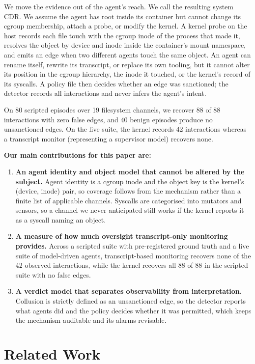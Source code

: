 \documentclass[11pt]{article}
\begin{document}
We move the evidence out of the agent's reach. We call the resulting system CDR.
We assume the agent has root inside its container but cannot change its cgroup
membership, attach a probe, or modify the kernel. A kernel probe on the host
records each file touch with the cgroup inode of the process that made it, resolves
the object by device and inode inside the container's mount namespace, and emits an
edge when two different agents touch the same object. An agent can rename itself,
rewrite its transcript, or replace its own tooling, but it cannot alter its
position in the cgroup hierarchy, the inode it touched, or the kernel's record of
its syscalls. A policy file then decides whether an edge was sanctioned; the
detector records all interactions and never infers the agent's intent.

On 80 scripted episodes over 19 filesystem channels, we recover 88 of 88
interactions with zero false edges, and 40 benign episodes produce no unsanctioned
edges. On the live suite, the kernel records 42 interactions whereas a transcript
monitor (representing a supervisor model) recovers none.

\filbreak
\textbf{Our main contributions for this paper are:}
\begin{enumerate}\sloppy
\item \textbf{An agent identity and object model that cannot be altered by the
subject.} Agent identity is a cgroup inode and the object key is the kernel's
(device, inode) pair, so coverage follows from the mechanism rather than a finite
list of applicable channels. Syscalls are categorised into mutators and sensors, so
a channel we never anticipated still works if the kernel reports it as a syscall
naming an object.
\item \textbf{A measure of how much oversight transcript-only monitoring
provides.} Across a scripted suite with pre-registered ground truth and a live
suite of model-driven agents, transcript-based monitoring recovers none of the 42
observed interactions, while the kernel recovers all 88 of 88 in the scripted suite
with no false edges.
\item \textbf{A verdict model that separates observability from
interpretation.} Collusion is strictly defined as an unsanctioned edge, so the
detector reports what agents did and the policy decides whether it was permitted,
which keeps the mechanism auditable and its alarms revisable.
\end{enumerate}


\section{Related Work}
\end{document}
